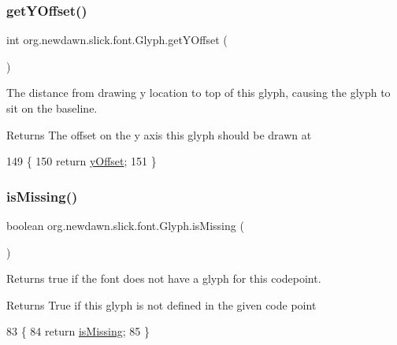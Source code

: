 \subsubsection{\texorpdfstring{get\+Y\+Offset()}{getYOffset()}}
{\footnotesize\ttfamily int org.\+newdawn.\+slick.\+font.\+Glyph.\+get\+Y\+Offset (\begin{DoxyParamCaption}{ }\end{DoxyParamCaption})\hspace{0.3cm}{\ttfamily [inline]}}

The distance from drawing y location to top of this glyph, causing the glyph to sit on the baseline.

\begin{DoxyReturn}{Returns}
The offset on the y axis this glyph should be drawn at 
\end{DoxyReturn}

\begin{DoxyCode}
149                             \{
150         \textcolor{keywordflow}{return} \mbox{\hyperlink{classorg_1_1newdawn_1_1slick_1_1font_1_1_glyph_ae04dea0b41cbbcd6b10c7f70a8c704f8}{yOffset}};
151     \}
\end{DoxyCode}
\mbox{\label{classorg_1_1newdawn_1_1slick_1_1font_1_1_glyph_a2d0b164910c22c995b6cd62ed2f025cf}} 
\subsubsection{\texorpdfstring{is\+Missing()}{isMissing()}}
{\footnotesize\ttfamily boolean org.\+newdawn.\+slick.\+font.\+Glyph.\+is\+Missing (\begin{DoxyParamCaption}{ }\end{DoxyParamCaption})\hspace{0.3cm}{\ttfamily [inline]}}

Returns true if the font does not have a glyph for this codepoint.

\begin{DoxyReturn}{Returns}
True if this glyph is not defined in the given code point 
\end{DoxyReturn}

\begin{DoxyCode}
83                                 \{
84         \textcolor{keywordflow}{return} \mbox{\hyperlink{classorg_1_1newdawn_1_1slick_1_1font_1_1_glyph_a2d0b164910c22c995b6cd62ed2f025cf}{isMissing}};
85     \}
\end{DoxyCode}
\mbox{\label{classorg_1_1newdawn_1_1slick_1_1font_1_1_glyph_a283dab0c8eb380fb5e4b137e15237d12}} 
